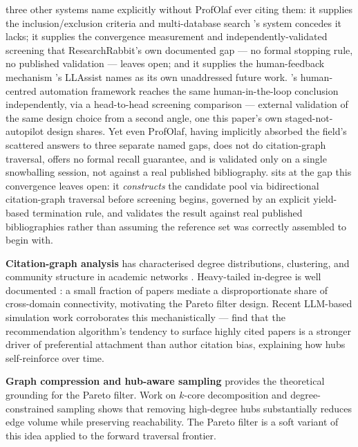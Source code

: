three other systems name explicitly without ProfOlaf ever citing them: it supplies the
inclusion/exclusion criteria and multi-database search \citet{Sami2024SLRAgents}'s system
concedes it lacks; it supplies the convergence measurement and independently-validated screening
that ResearchRabbit's own documented gap --- no formal stopping rule, no published validation
\citep{ColeBoutet2023ResearchRabbit} --- leaves open; and it supplies the human-feedback
mechanism \citet{Haryanto2024LLAssist}'s LLAssist names as its own unaddressed future work.
\citet{Mulla2026HCRA}'s human-centred automation framework reaches the same human-in-the-loop
conclusion independently, via a head-to-head screening comparison --- external validation of the
same design choice from a second angle, one this paper's own staged-not-autopilot design shares.
Yet even ProfOlaf, having implicitly absorbed the field's scattered answers to three separate
named gaps, does not do citation-graph traversal, offers no formal recall guarantee, and is
validated only on a single snowballing session, not against a real published bibliography.
\ldiscover{} sits at the gap this convergence leaves open: it \textit{constructs} the candidate
pool via bidirectional citation-graph traversal before screening begins, governed by an explicit
yield-based termination rule, and validates the result against real published bibliographies
rather than assuming the reference set was correctly assembled to begin with.

\textbf{Citation-graph analysis} has characterised degree distributions, clustering, and
community structure in academic networks \citep{BarabasiAlbert1999, Price1965}. Heavy-tailed
in-degree is well documented \citep{Redner2005, Barabasi2016}: a small fraction of papers
mediate a disproportionate share of cross-domain connectivity, motivating the Pareto filter
design. Recent LLM-based simulation
work corroborates this mechanistically --- \citet{Ji2025CiteAgent} find that the
recommendation algorithm's tendency to surface highly cited papers is a stronger driver of
preferential attachment than author citation bias, explaining how hubs self-reinforce over time.

\textbf{Graph compression and hub-aware sampling} provides the theoretical grounding for the
Pareto filter. Work on $k$-core decomposition \citep{Batagelj2003} and degree-constrained
sampling \citep{Stumpf2005} shows that removing high-degree hubs substantially reduces edge
volume while preserving reachability. The Pareto filter is a soft variant of this idea applied
to the forward traversal frontier.

